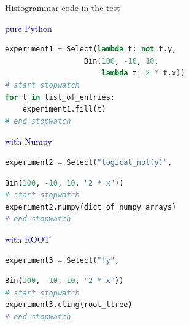 \documentclass{beamer}
\begin{document}
\begin{frame}[fragile]{Histogrammar code in the test}
\vspace{0.3 cm}

\hfill \textcolor{darkblue}{pure Python}

\vspace{-0.5 cm}
\begin{minipage}{0.8\linewidth}
\begin{lstlisting}[language=python]
experiment1 = Select(lambda t: not t.y,
                  Bin(100, -10, 10,
                      lambda t: 2 * t.x))
# start stopwatch
for t in list_of_entries:
    experiment1.fill(t)
# end stopwatch
\end{lstlisting}
\end{minipage}

\vspace{0.5 cm}
\hfill \textcolor{darkblue}{with Numpy}

\vspace{-0.5 cm}
\begin{minipage}{0.8\linewidth}
\begin{lstlisting}[language=python]
experiment2 = Select("logical_not(y)",
\end{lstlisting}
\end{minipage}

\vspace{-0.45 cm}
\begin{minipage}{\linewidth}
\begin{lstlisting}[language=python]
                  Bin(100, -10, 10, "2 * x"))
# start stopwatch
experiment2.numpy(dict_of_numpy_arrays)
# end stopwatch
\end{lstlisting}
\end{minipage}

\vspace{0.5 cm}
\hfill \textcolor{darkblue}{with ROOT}

\vspace{-0.5 cm}
\begin{minipage}{0.8\linewidth}
\begin{lstlisting}[language=python]
experiment3 = Select("!y",
\end{lstlisting}
\end{minipage}

\vspace{-0.45 cm}
\begin{minipage}{\linewidth}
\begin{lstlisting}[language=python]
                  Bin(100, -10, 10, "2 * x"))
# start stopwatch
experiment3.cling(root_ttree)
# end stopwatch
\end{lstlisting}
\end{minipage}
\end{frame}
\end{document}
